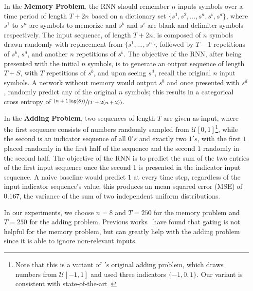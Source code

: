 \documentclass{article}
\begin{document}
In the \textbf{Memory Problem}, the RNN should remember $n$ inputs symbols over a time period of length $T + 2n$ based on a dictionary set $\{s^1, s^2, ..., s^n, s^b, s^d\}$, where $s^1$ to $s^n$ are symbols to memorize and $s^b$ and $s^i$ are blank and delimiter symbols respectively. The input sequence, of length $T + 2n$, is composed of $n$ symbols drawn randomly with replacement from $\{s^1, ..., s^n\}$, followed by $T-1$ repetitions of $s^b$, $s^d$, and another $n$ repetitions of $s^b$. The objective of the RNN, after being presented with the initial $n$ symbols, is to generate an output sequence of length $T + S$, with $T$ repetitions of $s^b$, and upon seeing $s^d$, recall the original $n$ input symbols.  A network without memory would output $s^b$ and once presented with $s^d$, randomly predict any of the original $n$ symbols; this results in a categorical cross entropy of $\sfrac{(n+1\log(8))}{(T+2(n+2))}$.%

In the \textbf{Adding Problem}, two sequences of length $T$ are given as input, where the first sequence consists of numbers randomly sampled from $\mathcal{U}[0,1]$\footnote{Note that this is a variant of~\cite{Hochreiter}'s original adding problem, which draws numbers from $\mathcal{U}[-1,1]$ and used three indicators  $\{-1,0,1\}$. Our variant is consistent with state-of-the-art~\cite{Arjovsky, Hyland, Wisdom}}, while the second is an indicator sequence of all $0's$ and exactly two $1's$, with the first $1$ placed randomly in the first half of the sequence and the second $1$ randomly in the second half.  The objective of the RNN is to predict the sum of the two entries of the first input sequence once the second 1 is presented in the indicator input sequence.  A naive baseline would predict $1$ at every time step, regardless of the input indicator sequence's value; this produces an mean squared error (MSE) of 0.167, \ie the variance of the sum of two independent uniform distributions. 

In our experiments, we choose $n=8$ and $T=250$ for the memory problem and $T=250$ for the adding problem. Previous works~\cite{Arjovsky, Hyland, Wisdom} have found that gating is not helpful for the memory problem, but can greatly help with the adding problem since it is able to ignore non-relevant inputs.
\end{document}
